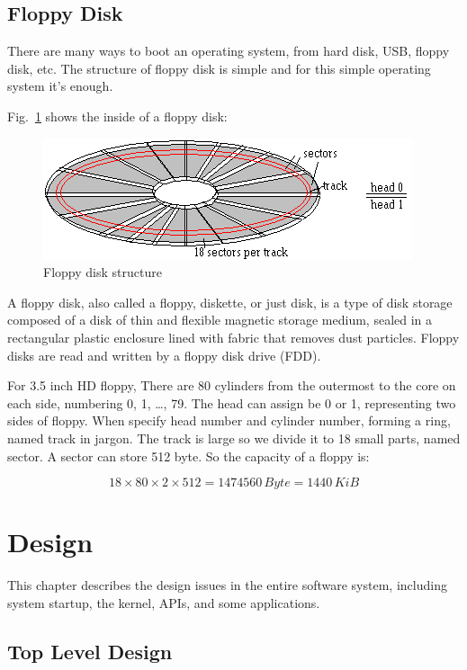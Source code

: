 \documentclass{swfcthesis}
\begin{document}
\section{Floppy Disk}

There are many ways to boot an operating system, from hard disk, USB, floppy disk, etc.
The structure of floppy disk is simple and for this simple operating system it's enough.

Fig.~\ref{fig:flpy1.png} shows the inside of a floppy disk:
\begin{figure}[!ht]
  \centering
  \includegraphics[width=.5\textwidth]{../figs/bootLoader/flpy1.png}
  \caption{Floppy disk structure}
  \label{fig:flpy1.png}
\end{figure}

A floppy disk, also called a floppy, diskette, or just disk, is a type of disk storage
composed of a disk of thin and flexible magnetic storage medium, sealed in a rectangular
plastic enclosure lined with fabric that removes dust particles. Floppy disks are read and
written by a floppy disk drive (FDD)\cite{wiki:floppy}.

For 3.5 inch HD floppy,  There are 80 cylinders from the outermost to
the core on each side, numbering 0, 1, \ldots, 79. The head can assign be 0 or 1,
representing two sides of floppy. When specify head number and cylinder number, forming a
ring, named track in jargon. The track is large so we divide it to 18 small parts, named
sector. A sector can store 512 byte. So the capacity of a floppy is:

\[18 \times 80 \times 2 \times 512 = 1474560\,Byte = 1440\,KiB\]

\fi %


\chapter{Design}

This chapter describes the design issues in the entire software system, including system startup,
the kernel, APIs, and some applications.


\section{Top Level Design}
\end{document}
